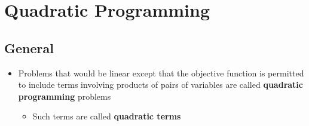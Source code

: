 \documentclass[11pt]{article}
\begin{document}
\section{Quadratic Programming}
\label{sec:org56e746f}
\subsection{General}
\label{sec:orgffbc4bd}
\begin{itemize}
\item Problems that would be linear except that the objective function is permitted to include terms involving products of pairs of variables are called \textbf{quadratic programming} problems
\begin{itemize}
\item Such terms are called \textbf{quadratic terms}
\end{itemize}
\end{itemize}
\end{document}
